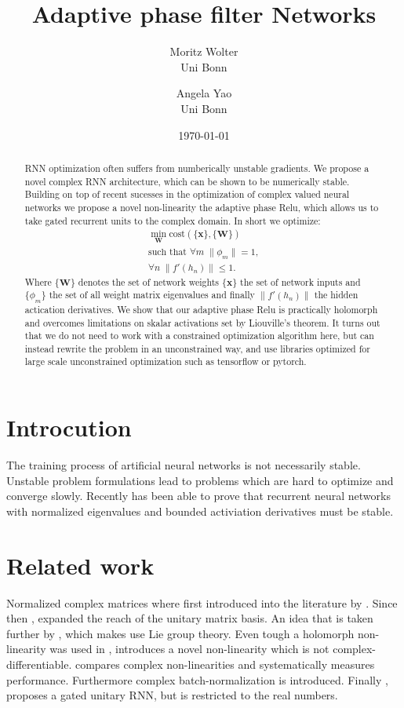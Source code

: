 \documentclass{article}
\title{Adaptive phase filter Networks}
\author{Moritz Wolter  \\
    Uni Bonn  \\
    \and 
    Angela Yao \\
    Uni Bonn \\
    }
\date{\today}
\begin{document}
\tableofcontents
\newpage
\maketitle
\begin{abstract}
RNN optimization often suffers from numberically unstable gradients. We propose a novel complex RNN architecture, which can be shown to be numerically stable. Building on top of recent sucesses in the optimization of complex valued neural networks we propose a novel non-linearity the adaptive phase Relu, which allows us to take gated recurrent units to the complex domain. In short we optimize: 
\begin{align}
\min_{\mathbf{W}} \text{cost}(\{\mathbf{x}\}, \{\mathbf{W}\}) \\
\text{such that } \forall m \; \| \phi_m \| = 1, \\
                  \forall n \; \| f'(h_n) \| \leq 1.
\end{align}
Where $\{\mathbf{W}\}$ denotes the set of network weights $\{\mathbf{x}\}$ the set of network inputs and $\{\phi_m\}$ the set of all weight matrix eigenvalues and finally $\|f'(h_n) \|$ the hidden actication derivatives.
We show that our adaptive phase Relu is practically holomorph and overcomes limitations on skalar activations set by Liouville's theorem.
It turns out that we do not need to work with a constrained optimization algorithm here, but can instead rewrite the problem in an unconstrained way, and use libraries optimized for large scale unconstrained optimization such as tensorflow or pytorch.
\end{abstract}

\section{Introcution}
The training process of artificial neural networks is not necessarily stable. Unstable problem formulations lead to problems which are hard to optimize and converge slowly. Recently \cite{Arjovsky} has been able to prove that recurrent neural networks with normalized eigenvalues and bounded activiation derivatives must be stable. 

\section{Related work}
Normalized complex matrices where first introduced into the literature by \cite{Arjovsky}. Since then \cite{Wisdom}, expanded the reach of the unitary matrix basis. An idea that is taken further by \cite{Hyland}, which makes use Lie group theory.  
Even tough a holomorph non-linearity was used in \cite{Guberman}, \cite{Arjovsky} introduces a novel non-linearity which is not complex-differentiable. \cite{Trabelsi} compares complex non-linearities and systematically measures performance. Furthermore complex batch-normalization is introduced.
Finally \cite{Jing}, proposes a gated unitary RNN, but is restricted to the real numbers. 
\end{document}
